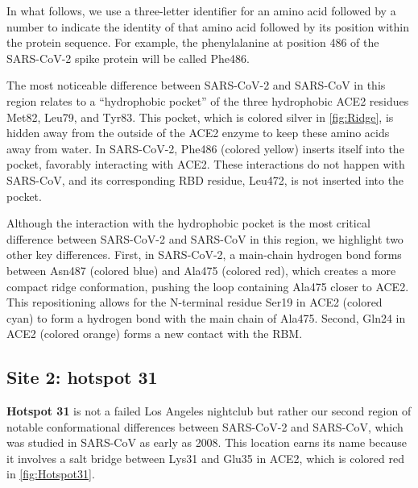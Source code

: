 In what follows, we use a three-letter identifier for an amino acid followed by a number to indicate the identity of that amino acid followed by its position within the protein sequence. For example, the phenylalanine at position 486 of the SARS-CoV-2 spike protein will be called Phe486.

The most noticeable difference between SARS-CoV-2 and SARS-CoV in this region relates to a ``hydrophobic pocket'' of the three hydrophobic ACE2 residues Met82, Leu79, and Tyr83. This pocket, which is colored silver in \autoref{fig:Ridge}, is hidden away from the outside of the ACE2 enzyme to keep these amino acids away from water. In SARS-CoV-2, Phe486 (colored yellow) inserts itself into the pocket, favorably interacting with ACE2. These interactions do not happen with SARS-CoV, and its corresponding RBD residue, Leu472, is not inserted into the pocket.

Although the interaction with the hydrophobic pocket is the most critical difference between SARS-CoV-2 and SARS-CoV in this region, we highlight two other key differences. First, in SARS-CoV-2, a main-chain hydrogen bond forms between Asn487 (colored blue) and Ala475 (colored red), which creates a more compact ridge conformation, pushing the loop containing Ala475 closer to ACE2. This repositioning allows for the N-terminal residue Ser19 in ACE2 (colored cyan) to form a hydrogen bond with the main chain of Ala475. Second, Gln24 in ACE2 (colored orange) forms a new contact with the RBM.

\FloatBarrier
{}
\subsection{Site 2: hotspot 31}

\textbf{Hotspot 31} is not a failed Los Angeles nightclub but rather our second region of notable conformational differences between SARS-CoV-2 and SARS-CoV, which was studied in SARS-CoV as early as 2008. This location earns its name because it involves a salt bridge between Lys31 and Glu35 in ACE2, which is colored red in \autoref{fig:Hotspot31}.\\

